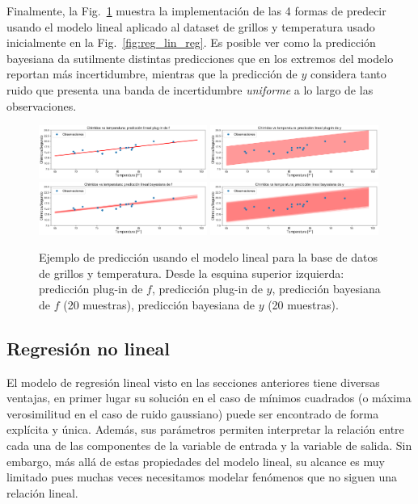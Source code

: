 Finalmente, la Fig.~\ref{fig:rpredicciones_reg_lin} muestra la implementación de las 4 formas de predecir usando el modelo lineal aplicado al dataset de grillos y temperatura usado inicialmente en la Fig.~\ref{fig:reg_lin_reg}. Es posible ver como la  predicción bayesiana da sutilmente distintas predicciones que en los extremos del modelo reportan más incertidumbre, mientras que la predicción de $y$ considera tanto ruido que presenta una banda de incertidumbre \emph{uniforme} a lo largo de las observaciones. 
\begin{figure}[H]
	\centering
	\includegraphics[width=0.49\textwidth]{img/cap2_chirridos_pred1}
	\includegraphics[width=0.49\textwidth]{img/cap2_chirridos_pred2}
	\includegraphics[width=0.49\textwidth]{img/cap2_chirridos_pred3}
	\includegraphics[width=0.49\textwidth]{img/cap2_chirridos_pred4}
	\caption{Ejemplo de predicción usando el modelo lineal para la  base de datos de grillos y temperatura. Desde la esquina superior izquierda: predicción plug-in de $f$, predicción plug-in de $y$, predicción bayesiana de $f$ (20 muestras), predicción bayesiana de $y$ (20 muestras).}
	\label{fig:rpredicciones_reg_lin} 
\end{figure}

\subsection{Regresión no lineal}

El modelo de regresión lineal visto en las secciones anteriores tiene diversas ventajas, en primer lugar su solución en el caso de mínimos cuadrados (o máxima verosimilitud en el caso de ruido gaussiano) puede ser encontrado de forma explícita y única. Además, sus parámetros permiten interpretar la relación entre cada una de las componentes de la variable de entrada y la variable de salida. Sin embargo, más allá de estas propiedades del modelo lineal, su alcance es muy limitado pues muchas veces necesitamos modelar fenómenos que no siguen una relación lineal. \\

